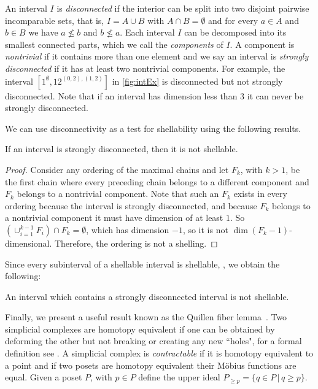 \documentclass[11pt,a4paper,oneside]{article}
\begin{document}
An interval $I$ is \emph{disconnected} if the interior can be split into two disjoint pairwise incomparable sets,
that is, $I=A\cup B$ with $A\cap B=\emptyset$ and for every $a\in A$
and $b\in B$ we have $a\not\le b$ and $b\not\le a$.
Each interval $I$ can be decomposed into its smallest connected parts, which we call the \emph{components} of $I$.
A component is \emph{nontrivial} if it contains more than one element
and we say an interval is \emph{strongly disconnected} if it has at least two nontrivial components.
For example, the interval $[1^\emptyset,12^{(0,2),(1,2)}]$ in \cref{fig:intEx} is disconnected
but not strongly disconnected. Note that if an interval has dimension less than $3$ it can
never be strongly disconnected.

We can use disconnectivity as a test for shellability using the following results.

\begin{lem}\label{lem:strongdis}
If an interval is strongly disconnected, then it is not shellable.
\begin{proof}
Consider any ordering of the maximal chains and let $F_k$, with $k>1$, be the first chain where
every preceding chain belongs to a different component and $F_k$ belongs to a
nontrivial component. Note that such an $F_k$ exists in every ordering because the interval
is strongly disconnected, and because $F_k$ belongs to a nontrivial component it must have dimension
of at least $1$. So $\left(\cup_{i=1}^{k-1}F_i\right)\cap F_k=\emptyset$,
which has dimension $-1$, so it is not $\dim(F_k-1)$-dimensional. Therefore, the ordering is not a
shelling.
\end{proof}
\end{lem}

Since every subinterval of a shellable interval is shellable, \cite[Corollary 3.1.9]{Wac07},
we obtain the following:

\begin{cor}
An interval which contains a strongly disconnected interval is not shellable.
\end{cor}

Finally, we present a useful result known as the Quillen fiber lemma~\cite{Quillen78}. Two simplicial
complexes are homotopy equivalent  if one can be obtained by deforming the other but
not breaking or creating any new ``holes", for a formal definition see \cite{Hat02}.
A simplicial complex is \emph{contractable} if it is
homotopy equivalent to a point and if two posets are homotopy equivalent their
M\"obius functions are equal.  Given a poset $P$, with $p \in P$ define the upper
ideal $P_{\ge p}=\{q\in P\,|\,q\ge p\}$.
\end{document}
